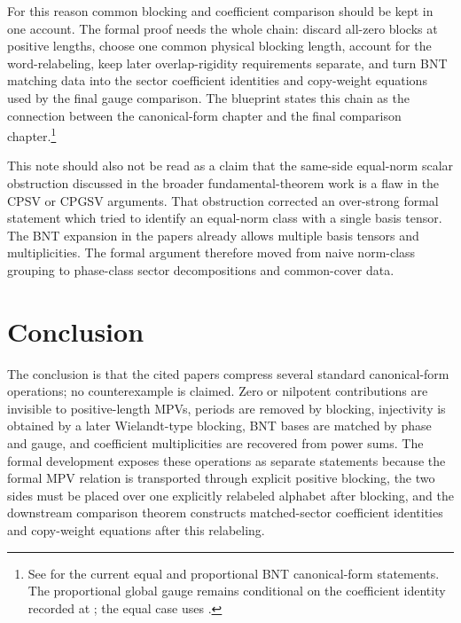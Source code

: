 \documentclass{article}
\begin{document}
For this reason common blocking and coefficient comparison should be kept in one
account. The formal proof needs the whole chain: discard all-zero blocks at
positive lengths, choose one common physical blocking length, account for the word-relabeling, keep later
overlap-rigidity requirements separate, and turn BNT matching data into the
sector coefficient identities and copy-weight equations used by the final gauge
comparison.
The blueprint states this chain as the connection between the canonical-form
chapter and the final comparison chapter.\footnote{See
 for the
current equal and proportional BNT canonical-form statements. The proportional
global gauge remains conditional on the coefficient identity recorded at
; the
equal case uses
.}

This note should also not be read as a claim that the same-side equal-norm scalar
obstruction discussed in the broader fundamental-theorem work is a flaw in the
CPSV or CPGSV arguments. That obstruction corrected an over-strong formal statement
which tried to identify an equal-norm class with a single basis tensor. The BNT
expansion in the papers already allows multiple basis tensors and multiplicities.
The formal argument therefore moved from naive norm-class grouping to phase-class
sector decompositions and common-cover data.

\section{Conclusion}

The conclusion is that the cited papers compress several standard canonical-form
operations; no counterexample is claimed. Zero or nilpotent contributions are
invisible to positive-length MPVs, periods are removed by blocking, injectivity is
obtained by a later Wielandt-type blocking, BNT bases are matched by phase and
gauge, and coefficient multiplicities are recovered from power sums. The formal
development exposes these operations as separate statements because the formal MPV
relation is transported through explicit positive blocking, the two sides must be
placed over one explicitly relabeled alphabet after blocking, and the downstream comparison theorem constructs
matched-sector coefficient identities and copy-weight equations after this
relabeling.
\end{document}
